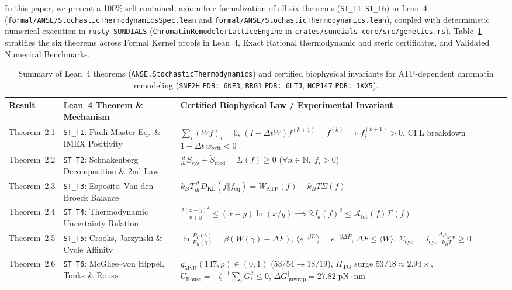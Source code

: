 \documentclass[11pt,a4paper]{article}
\renewcommand{\arraystretch}{1.35}
\theoremstyle{definition}
\begin{document}
In this paper, we present a 100\% self-contained, axiom-free formalization of all six theorems (\texttt{ST\_T1}--\texttt{ST\_T6}) in Lean~4 (\texttt{formal/ANSE/StochasticThermodynamicsSpec.lean} and \texttt{formal/ANSE/StochasticThermodynamics.lean}), coupled with deterministic numerical execution in \texttt{rusty-SUNDIALS} (\texttt{ChromatinRemodelerLatticeEngine} in \texttt{crates/sundials-core/src/genetics.rs}). Table~\ref{tab:paper_d_summary} stratifies the six theorems across Formal Kernel proofs in Lean~4, Exact Rational thermodynamic and steric certificates, and Validated Numerical Benchmarks.

\begin{table}[htbp]
\centering
\caption{Summary of Lean~4 theorems (\texttt{ANSE.StochasticThermodynamics}) and certified biophysical invariants for ATP-dependent chromatin remodeling (\texttt{SNF2H} \texttt{PDB: 6NE3}, \texttt{BRG1} \texttt{PDB: 6LTJ}, \texttt{NCP147} \texttt{PDB: 1KX5}).}
\label{tab:paper_d_summary}
\renewcommand{\arraystretch}{1.35}
\footnotesize
\begin{tabularx}{\textwidth}{@{}llX@{}}
\toprule
\textbf{Result} & \textbf{Lean~4 Theorem \& Mechanism} & \textbf{Certified Biophysical Law / Experimental Invariant} \\
\midrule
Theorem~2.1 & \texttt{ST\_T1}: Pauli Master Eq.\ \& IMEX Positivity & $\sum_i (Wf)_i = 0$, $(I - \Delta t W)f^{(k+1)} = f^{(k)} \implies f_i^{(k+1)} > 0$, CFL breakdown $1 - \Delta t\,w_{\mathrm{exit}} < 0$ \\
Theorem~2.2 & \texttt{ST\_T2}: Schnakenberg Decomposition \& 2nd Law & $\frac{d}{dt}S_{\mathrm{sys}} + \dot{S}_{\mathrm{med}} = \dot{\Sigma}(f) \ge 0$ ($\forall n \in \mathbb{N},\; f_i > 0$) \\
Theorem~2.3 & \texttt{ST\_T3}: Esposito--Van den Broeck Balance & $k_B T \frac{d}{dt}D_{\mathrm{KL}}(f\Vert f_{\mathrm{eq}}) = \dot{W}_{\mathrm{ATP}}(f) - k_B T \dot{\Sigma}(f)$ \\
Theorem~2.4 & \texttt{ST\_T4}: Thermodynamic Uncertainty Relation & $\frac{2(x-y)^2}{x+y} \le (x-y)\ln(x/y) \implies 2 J_d(f)^2 \le \mathcal{A}_{\mathrm{tot}}(f)\dot{\Sigma}(f)$ \\
Theorem~2.5 & \texttt{ST\_T5}: Crooks, Jarzynski \& Cycle Affinity & $\ln\frac{P_F(\gamma)}{P_R(\gamma)} = \beta(W(\gamma)-\Delta F)$, $\langle e^{-\beta W}\rangle = e^{-\beta\Delta F}$, $\Delta F \le \langle W\rangle$, $\dot{\Sigma}_{\mathrm{cyc}} = J_{\mathrm{cyc}}\frac{\Delta\mu_{\mathrm{ATP}}}{k_B T} \ge 0$ \\
Theorem~2.6 & \texttt{ST\_T6}: McGhee--von Hippel, Tonks \& Rouse & $g_{\mathrm{MvH}}(147,\rho) \in (0,1)$ ($53/54 \to 18/19$), $\Pi_{\mathrm{TG}}$ surge $53/18 \approx 2.94\times$, $\dot{U}_{\mathrm{Rouse}} = -\zeta^{-1}\sum_i G_i^2 \le 0$, $\Delta G_{\mathrm{unwrap}}^{\ddagger} = 27.82\;\mathrm{pN\cdot nm}$ \\
\bottomrule
\end{tabularx}
\end{table}
\end{document}

